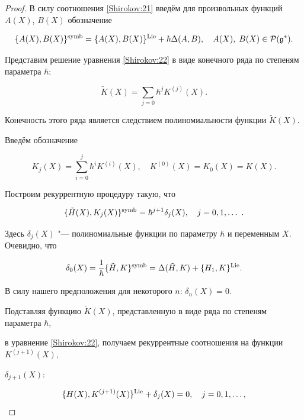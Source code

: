 \begin{proof}

В силу соотношения \eqref{Shirokov:21} введём для произвольных функций $ A(X)$, $B(X) $ обозначение

\[ 

 \{A(X),B(X)\}^{\rm symb}=\{A(X),B(X)\}^{\rm Lie}+\hbar\Delta(A,B),\quad A(X), \; B(X)\in \mathcal{P}(\mathfrak{g}^\ast).

 \]

Представим решение уравнения \eqref{Shirokov:22} в виде конечного ряда по степеням параметра $ \hbar $: 

$$ \tilde{K}(X)=\sum_{j=0}\hbar^j K^{(j)}(X) .$$ 

Конечность этого ряда является следствием полиномиальности функции $ \tilde{K}(X)$. 

Введём обозначение  

$$ K_j(X)=\sum_{i=0}^{j}\hbar^i K^{(i)}(X),\quad  K^{(0)}(X)=K_0(X)=K(X) .$$

Построим рекуррентную процедуру такую, что

\begin{equation}

\label{Shirokov:22a}

\{\tilde{H}(X),K_j(X)\}^{\rm symb}=\hbar^{j+1}\delta_j(X),\quad j=0, 1,\dots\ .

\end{equation}

Здесь $ \delta_j(X) $ "--- полиномиальные функции по параметру $ \hbar $ и переменным $ X $. Очевидно, что 

\begin{equation}\label{delta0}

\delta_0(X)=\frac{1}{\hbar}\{\tilde{H},K\}^{\rm symb}=\Delta(\tilde{H},K)+\{H_1,K\}^{\rm Lie}.

\end{equation}

 В силу нашего предположения для некоторого $ n$: $\delta_n(X)=0 $.

Подставляя функцию $ \tilde{K}(X) $, представленную в виде ряда по степеням параметра $ \hbar $, 

в уравнение \eqref{Shirokov:22}, получаем рекуррентные соотношения на функции $K^{(j+1)}(X), $ 

$ \delta_{j+1}(X)$:

\begin{equation}

\label{Shirokov:23}

\{H(X),K^{(j+1)}(X)\}^{\rm Lie}+\delta_j(X)=0,\quad j=0, 1,\dots,


\end{equation}
\end{proof}
